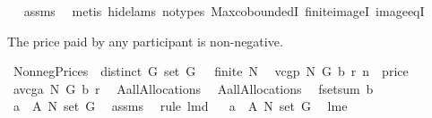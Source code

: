 \begin{isabellebody}
\isadelimproof
\ %
\endisadelimproof
%
\isatagproof
{}\isamarkupfalse%
\ assms\ \isanewline
{}\isamarkupfalse%
\ {\isacharparenleft}metis\ {\isacharparenleft}hide{\isacharunderscore}lams{\isacharcomma}\ no{\isacharunderscore}types{\isacharparenright}\ Max{\isachardot}coboundedI\ finite{\isacharunderscore}imageI\ image{\isacharunderscore}eqI{\isacharparenright}%
\endisatagproof
{\isafoldproof}%
%
\isadelimproof
%
\endisadelimproof
%
\begin{isamarkuptext}%
The price paid by any participant is non-negative.%
\end{isamarkuptext}%
\isamarkuptrue%
\isamarkupfalse%
\ NonnegPrices{\isacharcolon}\ \ {\isachardoublequoteopen}distinct\ G{\isachardoublequoteclose}\ {\isachardoublequoteopen}set\ G\ {\isasymnoteq}\ {\isacharbraceleft}{\isacharbraceright}{\isachardoublequoteclose}\ {\isachardoublequoteopen}finite\ N{\isachardoublequoteclose}\ \ \isanewline
{\isachardoublequoteopen}vcgp{\isacharprime}\ N\ G\ {\isacharparenleft}b{\isacharparenright}\ r\ n\ {\isachargreater}{\isacharequal}\ {\isacharparenleft}{}{\isacharcolon}{\isacharcolon}price{\isacharparenright}{\isachardoublequoteclose}\ \isanewline
%
\isadelimproof
%
\endisadelimproof
%
\isatagproof
{}\isamarkupfalse%
\ {\isacharminus}\ \isanewline
{}\isamarkupfalse%
\ {\isacharquery}a{\isacharequal}{\isachardoublequoteopen}vcga{\isacharprime}\ N\ G\ b\ r{\isachardoublequoteclose}\ \isamarkupfalse%
\ {\isacharquery}A{\isacharequal}allAllocations{\isacharprime}\ \isamarkupfalse%
\ {\isacharquery}A{\isacharprime}{\isacharequal}allAllocations{\isacharprime}{\isacharprime}{\isacharprime}{\isacharprime}\ \isamarkupfalse%
\ {\isacharquery}f{\isacharequal}{\isachardoublequoteopen}setsum\ b{\isachardoublequoteclose}\ \isanewline
{}\isamarkupfalse%
\ {\isachardoublequoteopen}{\isacharquery}a\ {\isasymin}\ {\isacharquery}A\ N\ {\isacharparenleft}set\ G{\isacharparenright}{\isachardoublequoteclose}\ \isamarkupfalse%
\ assms\ \isamarkupfalse%
\ {\isacharparenleft}rule\ lm{}{}d{\isacharparenright}\isanewline
{}\isamarkupfalse%
\ \isamarkupfalse%
\ {\isachardoublequoteopen}{\isacharquery}a\ {\isasymin}\ {\isacharquery}A{\isacharprime}\ N\ {\isacharparenleft}set\ G{\isacharparenright}{\isachardoublequoteclose}\ \isamarkupfalse%
\ lm{}{}e\ \isamarkupfalse%

\end{isabellebody}
